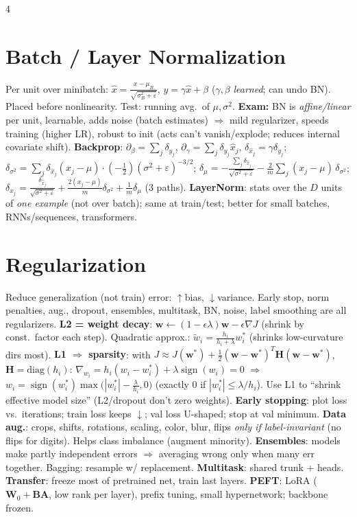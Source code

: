 \documentclass[8pt,landscape]{extarticle}
\newcommand{\W}{\mathbf{W}}
\newcommand{\w}{\mathbf{w}}
\newcommand{\Hm}{\mathbf{H}}
\newcommand{\ex}{\textbf{\color{BrickRed}Exam:} }
\newcommand{\sgn}{\operatorname{sign}}
\begin{document}
\begin{multicols*}{4}
\section{Batch / Layer Normalization}
Per unit over minibatch: $\hat x=\frac{x-\mu_B}{\sqrt{\sigma_B^2+\varepsilon}}$, $y=\gamma\hat x+\beta$ ($\gamma,\beta$ \emph{learned}; can undo BN). Placed before nonlinearity. Test: running avg.\ of $\mu,\sigma^2$.
\ex BN is \emph{affine/linear} per unit, learnable, adds noise (batch estimates) $\Rightarrow$ mild regularizer, speeds training (higher LR), robust to init (acts can't vanish/explode; reduces internal covariate shift).
\textbf{Backprop}: $\partial_\beta=\sum_j\delta_{y_j}$, $\partial_\gamma=\sum_j\delta_{y_j}\hat x_j$, $\delta_{\hat x_j}=\gamma\delta_{y_j}$;
$\delta_{\sigma^2}=\sum_j\delta_{\hat x_j}(x_j-\mu)\cdot(-\tfrac12)(\sigma^2+\varepsilon)^{-3/2}$;
$\delta_\mu=-\frac{\sum_j\delta_{\hat x_j}}{\sqrt{\sigma^2+\varepsilon}}-\frac2m\sum_j(x_j-\mu)\,\delta_{\sigma^2}$;
$\delta_{x_j}=\frac{\delta_{\hat x_j}}{\sqrt{\sigma^2+\varepsilon}}+\frac{2(x_j-\mu)}m\delta_{\sigma^2}+\frac1m\delta_\mu$ (3 paths).
\textbf{LayerNorm}: stats over the $D$ units of \emph{one example} (not over batch); same at train/test; better for small batches, RNNs/sequences, transformers.

\section{Regularization}
Reduce generalization (not train) error: $\uparrow$bias, $\downarrow$variance. Early stop, norm penalties, aug., dropout, ensembles, multitask, BN, noise, label smoothing are all regularizers.
\textbf{L2 = weight decay}: $\w\leftarrow(1-\epsilon\lambda)\w-\epsilon\nabla J$ (shrink by const.\ factor each step). Quadratic approx.: $\tilde w_i=\frac{h_i}{h_i+\lambda}w_i^*$ (shrinks low-curvature dirs most).
\textbf{L1 $\Rightarrow$ sparsity}: with $J\approx J(\w^*)+\frac12(\w-\w^*)^T\Hm(\w-\w^*)$, $\Hm=\text{diag}(h_i)$: $\nabla_{w_i}=h_i(w_i-w_i^*)+\lambda\sgn(w_i)=0$ $\Rightarrow$ $w_i=\sgn(w_i^*)\max\big(|w_i^*|-\frac{\lambda}{h_i},0\big)$ (exactly 0 if $|w_i^*|\le\lambda/h_i$). Use L1 to ``shrink effective model size'' (L2/dropout don't zero weights).
\textbf{Early stopping}: plot loss vs.\ iterations; train loss keeps $\downarrow$; val loss U-shaped; stop at val minimum.
\textbf{Data aug.}: crops, shifts, rotations, scaling, color, blur, flips \emph{only if label-invariant} (no flips for digits). Helps class imbalance (augment minority).
\textbf{Ensembles}: models make partly independent errors $\Rightarrow$ averaging wrong only when many err together. Bagging: resample w/ replacement.
\textbf{Multitask}: shared trunk + heads. \textbf{Transfer}: freeze most of pretrained net, train last layers. \textbf{PEFT}: LoRA ($\W_0+\mathbf B\mathbf A$, low rank per layer), prefix tuning, small hypernetwork; backbone frozen.


\end{multicols*}
\end{document}
